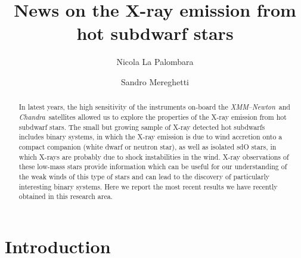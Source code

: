 \documentclass[USenglish,twocolumn]{article}
\def\XMM{{\em XMM--Newton}}
\def\Chandra{{\em Chandra}}
\begin{document}
 


  \author*[1]{Nicola La Palombara}

  \author[2]{Sandro Mereghetti}



  \title{\huge News on the X-ray emission from hot subdwarf stars}


  \begin{abstract}
{In latest years, the high sensitivity of the instruments on-board the \XMM\ and \Chandra\ satellites allowed us to explore the properties of the X-ray emission from hot subdwarf stars. The small but growing sample of X-ray detected hot subdwarfs includes binary systems, in which the X-ray emission is due to wind accretion onto a compact companion (white dwarf or neutron star), as well as isolated sdO stars, in which X-rays are probably due to shock instabilities in the wind. X-ray observations of these low-mass stars provide information which can be useful for our understanding of the weak winds of this type of stars and can lead to the discovery of particularly interesting binary systems. Here we report the most recent results we have recently obtained in this research area.}
\end{abstract}


 

\maketitle
\section{Introduction}
\end{document}
